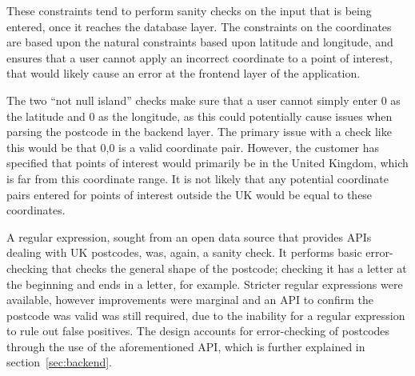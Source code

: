 \begin{table}[H]
\centering
{}
\caption{A list of constraints in the points\_of\_interest relation}
\label{poi_constraints}
\end{table}

These constraints tend to perform sanity checks on the input that is being entered, once it reaches the database layer. The constraints on the coordinates are based upon the natural constraints based upon latitude and longitude, and ensures that a user cannot apply an incorrect coordinate to a point of interest, that would likely cause an error at the frontend layer of the application.

The two ``not null island'' checks make sure that a user cannot simply enter 0 as the latitude and 0 as the longitude, as this could potentially cause issues when parsing the postcode in the backend layer. The primary issue with a check like this would be that 0,0 is a valid coordinate pair. However, the customer has specified that points of interest would primarily be in the United Kingdom, which is far from this coordinate range. It is not likely that any potential coordinate pairs entered for points of interest outside the UK would be equal to these coordinates.

A regular expression, sought from an open data source that provides APIs dealing with UK postcodes\cite{PostcodeRegex}, was, again, a sanity check. It performs basic error-checking that checks the general shape of the postcode; checking it has a letter at the beginning and ends in a letter, for example. Stricter regular expressions were available, however improvements were marginal and an API to confirm the postcode was valid was still required, due to the inability for a regular expression to rule out false positives. The design accounts for error-checking of postcodes through the use of the aforementioned API, which is further explained in section~\ref{sec:backend}. 


